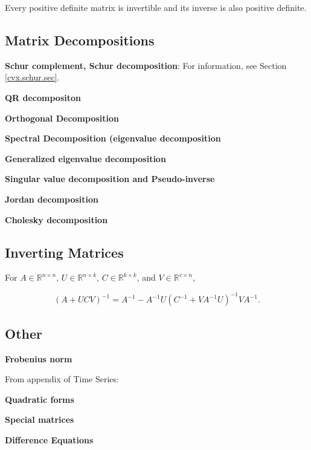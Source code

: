 Every positive definite matrix is invertible and its inverse is also positive definite.

\subsection{Matrix Decompositions}

\textbf{Schur complement, Schur decomposition}: For information, see Section \ref{cvx.schur.sec}.

\textbf{QR decompositon}

\textbf{Orthogonal Decomposition}

\textbf{Spectral Decomposition (eigenvalue decomposition}

\textbf{Generalized eigenvalue decomposition}

\textbf{Singular value decomposition and Pseudo-inverse}

\textbf{Jordan decomposition}

\textbf{Cholesky decomposition}

\subsection{Inverting Matrices}

\begin{theorem} For \(A \in \mathbb{R}^{n \times n}\), \(U \in \mathbb{R}^{n \times k}\), \(C \in \mathbb{R}^{k \times k}\), and \(V \in \mathbb{R}^{v \times n}\),

\[
(A + UCV)^{-1} = A^{-1} - A^{-1}U(C^{-1} + VA^{-1}U)^{-1}VA^{-1}.
\]

\end{theorem}

\begin{theorem}

\end{theorem}

\subsection{Other}

\textbf{Frobenius norm}

From appendix of Time Series:

\textbf{Quadratic forms}

\textbf{Special matrices}

\textbf{Difference Equations}

